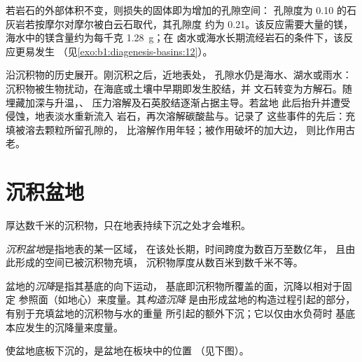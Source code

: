 若岩石的外部体积不变，则损失的固体即为增加的孔隙空间：
孔隙度为 \num{0.10} 的石灰岩若按摩尔对摩尔被白云石取代，其孔隙度
约为 \num{0.21}。该反应需要大量的镁，
海水中的镁含量约为每千克 \qty{1.28}{g}；在
卤水或海水长期流经岩石的条件下，该反应更易发生
（见\cref{exo:b1:diagenesis-basins:12}）。

沿沉积物的历史展开。刚沉积之后，近地表处，
孔隙水仍是海水、湖水或雨水：
沉积物被生物扰动，在海底或土壤中早期即发生胶结，并
文石转变为方解石。随埋藏加深与升温，、
压力溶解及石英胶结逐渐占据主导。若盆地
此后抬升并遭受侵蚀，地表淡水重新流入
岩石，再次溶解碳酸盐与。记录了
这些事件的先后：充填被溶去颗粒所留孔隙的，
比溶解作用年轻；被作用破坏的加大边，
则比作用古老。

\section{沉积盆地}\label{sec:b1:diagenesis-basins:basins}

厚达数千米的沉积物，只在地表持续下沉之处才会堆积。

\begin{definition}[沉积盆地]\label{def:b1:diagenesis-basins:basin}
\emph{沉积盆地}是指地表的某一区域，
在该处长期，时间跨度为数百万至数亿年，
且由此形成的空间已被沉积物充填，
沉积物厚度从数百米到数千米不等。
\end{definition}

\begin{definition}[沉降，构造沉降]\label{def:b1:diagenesis-basins:subsidence}
盆地的\emph{沉降}是指其基底的向下运动，
基底即沉积物所覆盖的面，沉降以相对于固定
参照面（如地心）来度量。其\emph{构造沉降}
是由形成盆地的构造过程引起的部分，
有别于充填盆地的沉积物与水的重量
所引起的额外下沉；它以仅由水负荷时
基底本应发生的沉降量来度量。
\end{definition}

使盆地底板下沉的，是盆地在板块中的位置
（见下图）。

